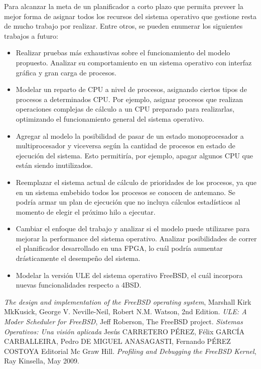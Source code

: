 \documentclass[a4paper]{book}
\begin{document}
Para alcanzar la meta de un planificador a corto plazo que permita preveer la mejor forma de asignar todos los recursos del sistema operativo que gestione resta de mucho trabajo por realizar. Entre otros, se pueden enumerar los siguientes trabajos a futuro:
\begin{itemize}
\item Realizar pruebas más exhaustivas sobre el funcionamiento del modelo propuesto. Analizar su comportamiento en un sistema operativo con interfaz gráfica y gran carga de procesos.
\item Modelar un reparto de CPU a nivel de procesos, asignando ciertos tipos de procesos a determinados CPU. Por ejemplo, asignar procesos que realizan operaciones complejas de cálculo a un CPU preparado para realizarlas, optimizando el funcionamiento general del sistema operativo.
\item Agregar al modelo la posibilidad de pasar de un estado monoprocesador a multiprocesador y viceversa según la cantidad de procesos en estado de ejecución del sistema. Esto permitiría, por ejemplo, apagar algunos CPU que están siendo inutilizados.
\item Reemplazar el sistema actual de cálculo de prioridades de los procesos, ya que en un sistema embebido todos los procesos se conocen de antemano. Se podría armar un plan de ejecución que no incluya cálculos estadísticos al momento de elegir el próximo hilo a ejecutar.
\item Cambiar el enfoque del trabajo y analizar si el modelo puede utilizarse para mejorar la performance del sistema operativo. Analizar posibilidades de correr el planificador desarrollado en una FPGA, lo cuál podría aumentar drásticamente el desempeño del sistema.
\item Modelar la versión ULE del sistema operativo FreeBSD, el cuál incorpora nuevas funcionalidades respecto a 4BSD.
\end{itemize}


\begin{thebibliography}{9}
	\emph{The design and implementation of the FreeBSD operating system},
	Marshall Kirk MkKusick,
	George V. Neville-Neil,
	Robert N.M. Watson,
	2nd Edition.
	\emph{ULE: A Moder Scheduler for FreeBSD},
	Jeff Roberson, The FreeBSD project.
	\emph{Sistemas Operativos: Una visi\'on aplicada}
	Jes\'us CARRETERO P\'EREZ,
	F\'elix GARC\'IA CARBALLEIRA,
	Pedro DE MIGUEL ANASAGASTI,
	Fernando P\'EREZ COSTOYA
	Editorial Mc Graw Hill.
	\emph{Profiling and Debugging the FreeBSD Kernel},
	Ray Kinsella,
	May 2009.
\end{thebibliography}
\end{document}
